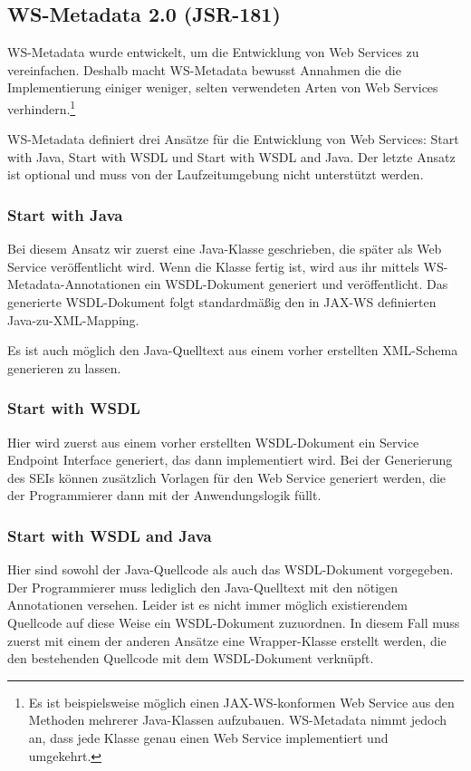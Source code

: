 \documentclass[runningheads]{llncs}
\newcommand{\germanquote}[1]{\glqq{}#1\grqq{}}
\begin{document}
  \label{jsr181}
  \subsection{WS-Metadata 2.0 (JSR-181)}
    WS-Metadata\cite{jsr_181} wurde entwickelt, um die Entwicklung von Web Services zu
    vereinfachen. Deshalb macht WS-Metadata bewusst Annahmen die die Implementierung einiger
    weniger, selten verwendeten Arten von Web Services verhindern.\footnote{Es ist beispielsweise
    möglich einen JAX-WS-konformen Web Service aus den Methoden mehrerer Java-Klassen aufzubauen.
    WS-Metadata nimmt jedoch an, dass jede Klasse genau einen Web Service implementiert und
    umgekehrt.}

    WS-Metadata definiert drei Ansätze für die Entwicklung von Web Services: \germanquote{Start
    with Java}, \germanquote{Start with WSDL} und \germanquote{Start with WSDL and Java}. Der
    letzte Ansatz ist optional und muss von der Laufzeitumgebung nicht unterstützt werden.

    \subsubsection*{Start with Java}
      Bei diesem Ansatz wir zuerst eine Java-Klasse geschrieben, die später als Web Service
      veröffentlicht wird. Wenn die Klasse fertig ist, wird aus ihr mittels
      WS-Metadata-Annotationen ein WSDL-Dokument generiert und veröffentlicht. Das generierte
      WSDL-Dokument folgt standardmäßig den in JAX-WS definierten Java-zu-XML-Mapping.

      Es ist auch möglich den Java-Quelltext aus einem vorher erstellten XML-Schema generieren zu
      lassen.

    \subsubsection*{Start with WSDL}
      Hier wird zuerst aus einem vorher erstellten WSDL-Dokument ein Service Endpoint Interface
      generiert, das dann implementiert wird. Bei der Generierung des SEIs können zusätzlich
      Vorlagen für den Web Service generiert werden, die der Programmierer dann mit der
      Anwendungslogik füllt.

    \subsubsection*{Start with WSDL and Java}
      Hier sind sowohl der Java-Quellcode als auch das WSDL-Dokument vorgegeben. Der Programmierer
      muss lediglich den Java-Quelltext mit den nötigen Annotationen versehen. Leider ist es nicht
      immer möglich existierendem Quellcode auf diese Weise ein WSDL-Dokument zuzuordnen. In diesem
      Fall muss zuerst mit einem der anderen Ansätze eine Wrapper-Klasse erstellt werden, die den
      bestehenden Quellcode mit dem WSDL-Dokument verknüpft.
\end{document}
